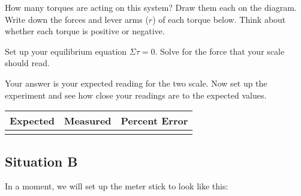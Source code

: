 \documentclass[10pt]{exam}
\begin{document}
\begin{questions}
  \question
  	How many torques are acting on this system?  Draw them each on the diagram.  Write down the forces and lever arms ($r$) of each torque below.  Think about whether each torque is positive or negative.

  \question
	  Set up your equilibrium equation $\Sigma\tau=0$.  Solve for the force that your scale should read.
    \vs[5]

  \question
	  Your answer is your expected reading for the two scale.  Now set up the experiment and see how close your readings are to the expected values.

    \begin{tabular}{*{3}{|p{12em}}|}
      \hline
      Expected & Measured & Percent Error \\
      \hline
      && \\[2em]
      \hline
    \end{tabular}

  \pagebreak
  \begin{EnvUplevel}
    \section*{Situation B}

    In a moment, we will set up the meter stick to look like this:
  \end{EnvUplevel}

  \begin{EnvUplevel}


\end{EnvUplevel}
\end{questions}
\end{document}
